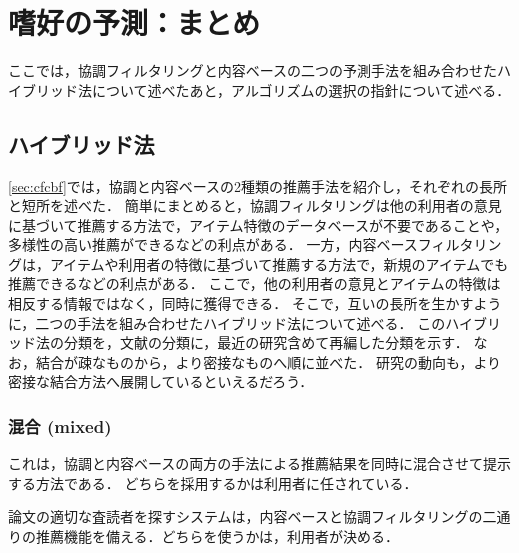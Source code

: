 \chapter{嗜好の予測：まとめ}
\label{sec:hybrid}


ここでは，協調フィルタリングと内容ベースの二つの予測手法を組み合わせたハイブリッド法について述べたあと，アルゴリズムの選択の指針について述べる．

\section{ハイブリッド法}
\label{sec:combmethod}

\ref{sec:cfcbf}では，協調と内容ベースの2種類の推薦手法を紹介し，それぞれの長所と短所を述べた．
簡単にまとめると，協調フィルタリングは他の利用者の意見に基づいて推薦する方法で，アイテム特徴のデータベースが不要であることや，多様性の高い推薦ができるなどの利点がある．
一方，内容ベースフィルタリングは，アイテムや利用者の特徴に基づいて推薦する方法で，新規のアイテムでも推薦できるなどの利点がある．
ここで，他の利用者の意見とアイテムの特徴は相反する情報ではなく，同時に獲得できる．
そこで，互いの長所を生かすように，二つの手法を組み合わせたハイブリッド法について述べる．
このハイブリッド法の分類を，文献\cite{ej:048}の分類に，最近の研究含めて再編した分類を示す．
なお，結合が疎なものから，より密接なものへ順に並べた．
研究の動向も，より密接な結合方法へ展開しているといえるだろう．

\subsection{混合 (mixed)}

これは，協調と内容ベースの両方の手法による推薦結果を同時に混合させて提示する方法である．
どちらを採用するかは利用者に任されている．

論文の適切な査読者を探すシステム\cite{jair:01:01}は，内容ベースと協調フィルタリングの二通りの推薦機能を備える．どちらを使うかは，利用者が決める．


